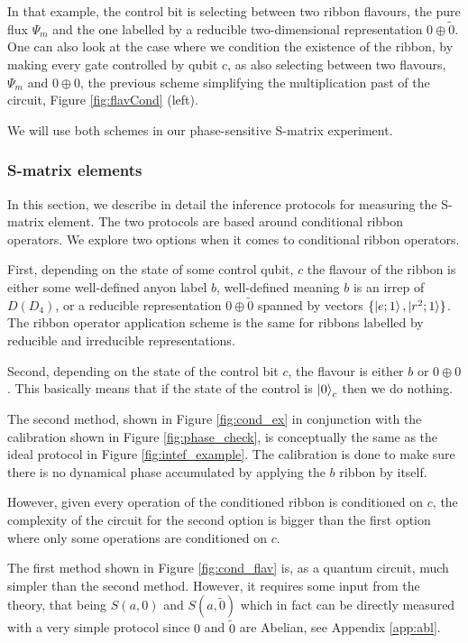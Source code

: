 \documentclass[two column]{article}
\begin{document}
In that example, the control bit is selecting between two ribbon flavours, the pure flux $\Psi_m$ and the one labelled by a reducible two-dimensional representation $0 \oplus \tilde{0}$. One can also look at the case where we condition the existence of the ribbon, by making every gate controlled by qubit $c$, as also selecting between two flavours, $\Psi_m$ and $0 \oplus 0$, the previous scheme simplifying the multiplication past of the circuit, Figure \ref{fig:flavCond} (left).

We will use both schemes in our phase-sensitive S-matrix experiment.

\subsubsection{S-matrix elements}

In this section, we describe in detail the inference protocols for measuring the S-matrix element.
The two protocols are based around conditional ribbon operators.
We explore two options when it comes to conditional ribbon operators.

First, depending on the state of some control qubit, $c$ the flavour of the ribbon is either some well-defined anyon label $b$, well-defined meaning $b$ is an irrep of $D(D_4)$, or a reducible representation $0\oplus\tilde{0}$ spanned by vectors $\{\ket{e;1}, \ket{r^2;1}\}$.
The ribbon operator application scheme is the same for ribbons labelled by reducible and irreducible representations.

Second, depending on the state of the control bit $c$, the flavour is either $b$ or $0\oplus 0$. This basically means that if the state of the control is $\ket{0}_c$ then we do nothing.

The second method, shown in Figure \ref{fig:cond_ex} in conjunction with the calibration shown in Figure \ref{fig:phase_check},  is conceptually the same as the ideal protocol in Figure \ref{fig:intef_example}. 
The calibration is done to make sure there is no dynamical phase accumulated by applying the $b$ ribbon by itself.

However, given every operation of the conditioned ribbon is conditioned on $c$, the complexity of the circuit for the second option is bigger than the first option where only some operations are conditioned on $c$.

The first method shown in Figure \ref{fig:cond_flav} is, as a quantum circuit, much simpler than the second method. 
However, it requires some input from the theory, that being $S(a, 0)$ and $S(a, \tilde{0})$ which in fact can be directly measured with a very simple protocol since $0$ and $\tilde{0}$ are Abelian, see Appendix \ref{app:abl}.
\end{document}

